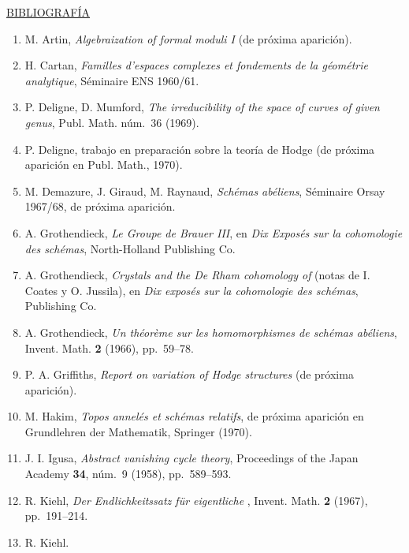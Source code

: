 
\bigskip
\noindent\underline{BIBLIOGRAFÍA}

\begin{enumerate}
\item[{[1]}] M. Artin, \emph{Algebraization of formal moduli I}
  (de próxima aparición).
\item[{[2]}] H. Cartan, \emph{Familles d'espaces complexes et fondements
  de la géométrie analytique}, Séminaire ENS 1960/61.
\item[{[3]}] P. Deligne, D. Mumford, \emph{The irreducibility of the space
  of curves of given genus}, Publ. Math. núm.~36 (1969).


\item[{[4]}] P. Deligne, trabajo en preparación sobre la teoría de Hodge
  (de próxima aparición en Publ. Math., 1970).
\item[{[5]}] M. Demazure, J. Giraud, M. Raynaud, \emph{Schémas
  abéliens}, Séminaire Orsay 1967/68, de próxima aparición.
\item[{[6]}] A. Grothendieck, \emph{Le Groupe de Brauer III}, en
  \emph{Dix Exposés sur la cohomologie des schémas}, North-Holland
  Publishing Co.
\item[{[7]}] A. Grothendieck, \emph{Crystals and the De Rham cohomology of
  } (notas de I. Coates y O. Jussila), en
  \emph{Dix exposés sur la cohomologie des schémas},
   Publishing Co.
\item[{[8]}] A. Grothendieck, \emph{Un théorème sur les homomorphismes de
  schémas abéliens}, Invent. Math. \textbf{2} (1966), pp.~59--78.
\item[{[9]}] P. A. Griffiths, \emph{Report on variation of Hodge
  structures} (de próxima aparición).
\item[{[10]}] M. Hakim, \emph{Topos annelés et schémas relatifs}, de
  próxima aparición en Grundlehren der Mathematik, Springer (1970).
\item[{[11]}] J. I. Igusa, \emph{Abstract vanishing cycle theory},
  Proceedings of the Japan Academy \textbf{34}, núm.~9 (1958),
  pp.~589--593.
\item[{[12]}] R. Kiehl, \emph{Der Endlichkeitssatz für eigentliche
  }, Invent. Math. \textbf{2} (1967),
  pp.~191--214.
\item[{[13]}] R. Kiehl.


\end{enumerate}
